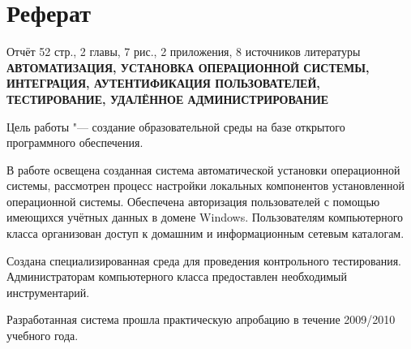 \newpage

\thispagestyle{empty}

\section*{Реферат}

\noindent
Отчёт 52 стр., 2 главы, 7 рис., 2 приложения, 8 источников литературы \\
\textbf{
АВТОМАТИЗАЦИЯ, УСТАНОВКА ОПЕРАЦИОННОЙ СИСТЕМЫ, \\ИНТЕГРАЦИЯ, АУТЕНТИФИКАЦИЯ
ПОЛЬЗОВАТЕЛЕЙ,\\ ТЕСТИРОВАНИЕ, УДАЛЁННОЕ АДМИНИСТРИРОВАНИЕ
}

Цель работы "--- создание образовательной среды на базе открытого 
программного обеспечения.

В работе освещена созданная система автоматической установки операционной
системы, рассмотрен процесс настройки локальных компонентов установленной
операционной системы. Обеспечена авторизация пользователей с помощью имеющихся
учётных данных в домене Windows. Пользователям компьютерного класса организован 
доступ к домашним и информационным сетевым каталогам. 

Создана специализированная среда для проведения контрольного тестирования. 
Администраторам компьютерного класса предоставлен необходимый инструментарий.

Разработанная система прошла практическую апробацию в течение 2009/2010 учебного
года. 

